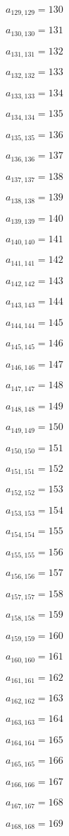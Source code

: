 \documentclass[a4paper,12pt]{article}
\begin{document}
$a _{ 129, 129 } = 130$

$a _{ 130, 130 } = 131$

$a _{ 131, 131 } = 132$

$a _{ 132, 132 } = 133$

$a _{ 133, 133 } = 134$

$a _{ 134, 134 } = 135$

$a _{ 135, 135 } = 136$

$a _{ 136, 136 } = 137$

$a _{ 137, 137 } = 138$

$a _{ 138, 138 } = 139$

$a _{ 139, 139 } = 140$

$a _{ 140, 140 } = 141$

$a _{ 141, 141 } = 142$

$a _{ 142, 142 } = 143$

$a _{ 143, 143 } = 144$

$a _{ 144, 144 } = 145$

$a _{ 145, 145 } = 146$

$a _{ 146, 146 } = 147$

$a _{ 147, 147 } = 148$

$a _{ 148, 148 } = 149$

$a _{ 149, 149 } = 150$

$a _{ 150, 150 } = 151$

$a _{ 151, 151 } = 152$

$a _{ 152, 152 } = 153$

$a _{ 153, 153 } = 154$

$a _{ 154, 154 } = 155$

$a _{ 155, 155 } = 156$

$a _{ 156, 156 } = 157$

$a _{ 157, 157 } = 158$

$a _{ 158, 158 } = 159$

$a _{ 159, 159 } = 160$

$a _{ 160, 160 } = 161$

$a _{ 161, 161 } = 162$

$a _{ 162, 162 } = 163$

$a _{ 163, 163 } = 164$

$a _{ 164, 164 } = 165$

$a _{ 165, 165 } = 166$

$a _{ 166, 166 } = 167$

$a _{ 167, 167 } = 168$

$a _{ 168, 168 } = 169$
\end{document}
